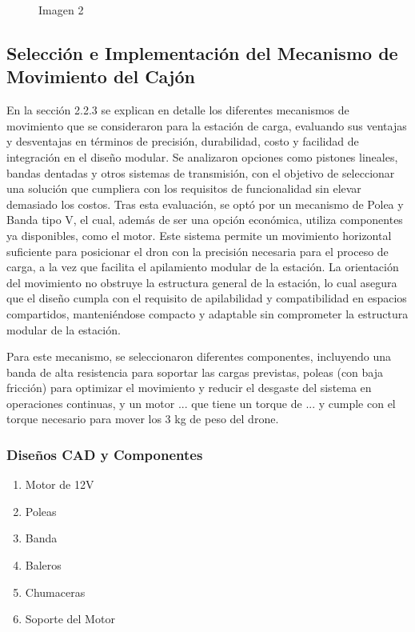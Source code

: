 \begin{figure}[h]
\begin{minipage}{0.45\textwidth}
            \caption{Imagen 2}
            \label{fig:imagen2}
        \end{minipage}%
        \hfill
    \end{figure}

\subsection{Selección e Implementación del Mecanismo de Movimiento del Cajón}

En la sección 2.2.3 se explican en detalle los diferentes mecanismos de movimiento que se consideraron para la estación de carga, evaluando sus ventajas y desventajas en términos de precisión, durabilidad, costo y facilidad de integración en el diseño modular. Se analizaron opciones como pistones lineales, bandas dentadas y otros sistemas de transmisión, con el objetivo de seleccionar una solución que cumpliera con los requisitos de funcionalidad sin elevar demasiado los costos. 
Tras esta evaluación, se optó por un mecanismo de Polea y Banda tipo V, el cual, además de ser una opción económica, utiliza componentes ya disponibles, como el motor. Este sistema permite un movimiento horizontal suficiente para posicionar el dron con la precisión necesaria para el proceso de carga, a la vez que facilita el apilamiento modular de la estación. La orientación del movimiento no obstruye la estructura general de la estación, lo cual asegura que el diseño cumpla con el requisito de apilabilidad y compatibilidad en espacios compartidos, manteniéndose compacto y adaptable sin comprometer la estructura modular de la estación.

Para este mecanismo, se seleccionaron diferentes componentes, incluyendo una banda de alta resistencia para soportar las cargas previstas, poleas (con baja fricción) para optimizar el movimiento y reducir el desgaste del sistema en operaciones continuas, y un motor ... que tiene un torque de ... y cumple con el torque necesario para mover los 3 kg de peso del drone.

    \subsubsection{Diseños CAD y Componentes}
        \begin{enumerate}
            \item Motor de 12V
            \item Poleas
            \item Banda
            \item Baleros
            \item Chumaceras 
            \item Soporte del Motor
        \end{enumerate}

